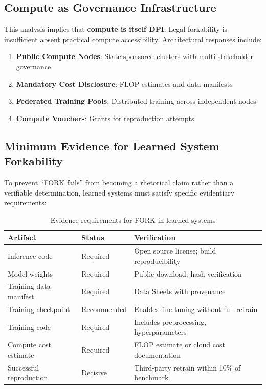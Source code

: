 \documentclass[11pt,a4paper]{article}
\theoremstyle{definition}
\begin{document}
\subsection{Compute as Governance Infrastructure}

This analysis implies that \textbf{compute is itself DPI}. Legal forkability is insufficient absent practical compute accessibility. Architectural responses include:
\begin{enumerate}[noitemsep]
    \item \textbf{Public Compute Nodes}: State-sponsored clusters with multi-stakeholder governance
    \item \textbf{Mandatory Cost Disclosure}: FLOP estimates and data manifests
    \item \textbf{Federated Training Pools}: Distributed training across independent nodes
    \item \textbf{Compute Vouchers}: Grants for reproduction attempts
\end{enumerate}

\subsection{Minimum Evidence for Learned System Forkability}
\label{subsec:fork-evidence}

To prevent ``FORK fails'' from becoming a rhetorical claim rather than a verifiable determination, learned systems must satisfy specific evidentiary requirements:

\begin{table}[htbp]
\centering
\small
\caption{Evidence requirements for FORK in learned systems}
\label{tab:ai-fork-evidence}
\begin{tabular}{@{}llp{5.5cm}@{}}
\toprule
\textbf{Artifact} & \textbf{Status} & \textbf{Verification} \\
\midrule
Inference code & Required & Open source license; build reproducibility \\
Model weights & Required & Public download; hash verification \\
Training data manifest & Required & Data Sheets \citep{gebru2021} with provenance \\
Training checkpoint & Recommended & Enables fine-tuning without full retrain \\
Training code & Required & Includes preprocessing, hyperparameters \\
Compute cost estimate & Required & FLOP estimate or cloud cost documentation \\
Successful reproduction & Decisive & Third-party retrain within 10\% of benchmark \\
\bottomrule
\end{tabular}
\end{table}
\end{document}
